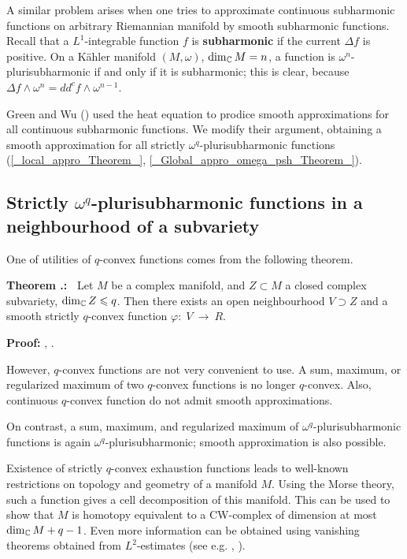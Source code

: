 \documentclass[11pt]{article}
\numberwithin{equation}{section}
\newcommand{\arrow}{{\:\longrightarrow\:}}
\newcommand{\C}{{\Bbb C}}
\newcommand{\6}{\partial}
\renewcommand{\phi}{\varphi}
\renewcommand{\leq}{\leqslant}
\newcounter{Mycounter}[section]
\newcounter{theorem}[section]
\renewcommand{\thetheorem}{{Theorem \thesection.\arabic{theorem}}}
\newcommand{\theorem}{%
    \setcounter{theorem}{\value{Mycounter}}
    \refstepcounter{theorem}
    \stepcounter{Mycounter}
    {\noindent \bf \thetheorem:\ }}
\newcounter{problem}[section]
\def\blacksquare{\hbox{\vrule width 5pt height 5pt depth 0pt}}
\def\endproof{\blacksquare}
\begin{document}
A similar problem arises when one tries to approximate
continuous subharmonic functions on arbitrary
Riemannian manifold by smooth subharmonic functions.
Recall that a $L^1$-integrable function
$f$ is {\bf subharmonic} if the current
$\Delta f$ is positive. On a K\"ahler manifold $(M, \omega)$,
$\dim_\C M=n$, a function is $\omega^n$-plurisubharmonic
if and only if it is subharmonic; this is clear,
because $\Delta f \wedge \omega^n= dd^cf \wedge \omega^{n-1}$.

Green and Wu (\cite{_Green_Wu:approx_}) used the heat equation
to prodice smooth approximations for all continuous
subharmonic functions.  We modify their argument, obtaining
a smooth approximation for all strictly 
$\omega^q$-plu\-ri\-sub\-har\-monic functions 
(\ref{_local_appro_Theorem_},
\ref{_Global_appro_omega_psh_Theorem_}).

\subsection{Strictly $\omega^q$-plurisubharmonic functions
in a neighbourhood of a subvariety}

One of utilities of $q$-convex functions comes from the following
theorem.

\hfill

\theorem
Let $M$ be a complex manifold, and $Z\subset M$ 
a closed complex subvariety, $\dim_\C Z\leq q$.
Then there exists an open neighbourhood 
$V\supset Z$ and a smooth strictly 
$q$-convex function $\phi:\; V \arrow R$.

\hfill

{\bf Proof:} \cite{_Barlet_}, \cite{_Demailly:q-convex_}. \endproof

\hfill

However, $q$-convex functions are not very convenient to use.
A sum, maximum, or regularized maximum of two $q$-convex 
functions  is no longer $q$-convex. Also, continuous
$q$-convex function do not admit smooth approximations.

On contrast, a sum, maximum, and regularized maximum
of $\omega^q$-plu\-ri\-sub\-harmonic functions is again 
$\omega^q$-plu\-ri\-sub\-har\-monic; smooth approximation is
 also possible. 

Existence of strictly $q$-convex exhaustion functions leads
to well-known restrictions on topology and geometry of a manifold $M$.
Using the Morse theory, such a function gives a cell decomposition
of this manifold. This can be used to show that $M$ is homotopy equivalent
to a CW-complex of dimension at most $\dim_\C M +q -1$.
Even more information can be obtained using 
vanishing theorems obtained from $L^2$-estimates
(see e.g. \cite{_Demailly:q-convex_}, \cite{_Ohsawa_}). 
\end{document}

